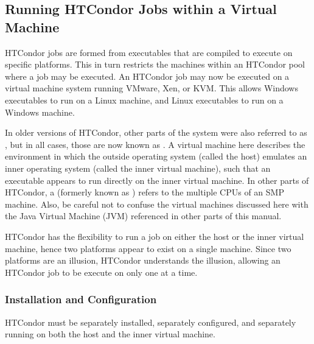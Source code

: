 \subsection{\label{sec:Virtual-Machines}
Running HTCondor Jobs within a Virtual Machine}

HTCondor jobs are formed from executables that are compiled to execute
on specific platforms.
This in turn restricts the machines within an HTCondor pool where
a job may be executed.
An HTCondor job may now be executed on a 
virtual machine system running VMware, Xen, or KVM.
This allows Windows executables to run on a Linux machine,
and Linux executables to run on a Windows machine.

In older versions of HTCondor, other parts of the system were also
referred to as , but in all cases, those are now
known as .
A virtual machine here describes the environment in which
the outside operating system (called the host) emulates an inner operating
system (called the inner virtual machine),
such that an executable appears to run directly
on the inner virtual machine.
In other parts of HTCondor, a  (formerly known as
) refers to the multiple CPUs of an SMP
machine.
Also, be careful not to confuse the virtual machines discussed here
with the Java Virtual Machine (JVM) referenced in other parts of this
manual.

HTCondor has the flexibility to run a job on either the host
or the inner virtual machine, 
hence two platforms appear to exist on a single machine.
Since two platforms are an illusion, HTCondor understands the illusion, 
allowing an HTCondor job to be execute on only
one at a time.

\subsubsection{\label{sec:Virtual-Machines-Configuration}
Installation and Configuration}

HTCondor must be separately installed, separately configured,
and separately running on both
the host and the inner virtual machine.

